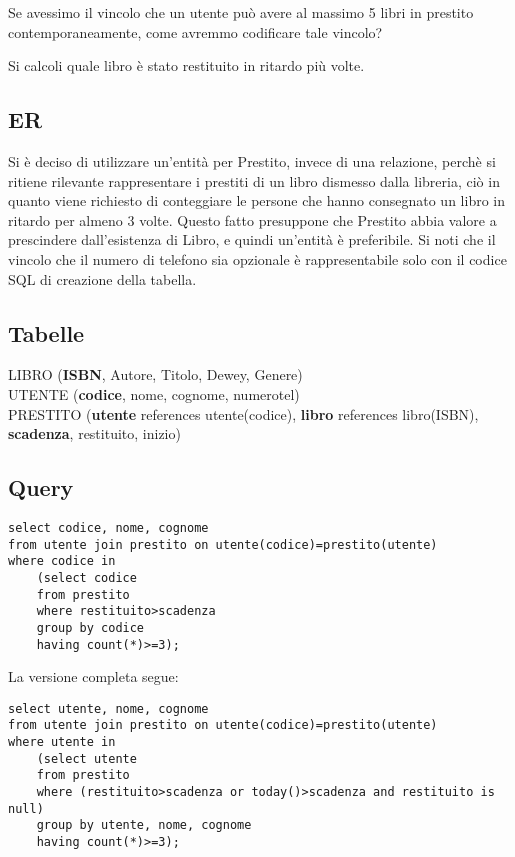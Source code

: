 \documentclass[11pt]{article}
\begin{document}
Se avessimo il vincolo che un utente pu\`o avere al massimo 5 libri in
prestito contemporaneamente, come avremmo codificare tale vincolo?

Si calcoli quale libro \`e stato restituito in ritardo pi\`u volte.

\subsection{ER}
\begin{center}
\end{center}

Si \`e deciso di utilizzare un'entit\`a per Prestito, invece di una relazione, perch\`e si
ritiene rilevante rappresentare i prestiti di un libro dismesso dalla libreria, ci\`o in
quanto viene richiesto di conteggiare le persone che hanno consegnato un libro in ritardo
per almeno 3 volte. Questo fatto presuppone che Prestito abbia valore a prescindere
dall'esistenza di Libro, e quindi un'entit\`a \`e preferibile. Si noti che il
vincolo che il numero di telefono sia opzionale \`e rappresentabile solo con il
codice SQL di creazione della tabella.

\subsection{Tabelle}

\noindent
LIBRO (\textbf{ISBN}, Autore, Titolo, Dewey, Genere)\\
UTENTE (\textbf{codice}, nome, cognome, numerotel)\\
PRESTITO (\textbf{utente} references utente(codice), \textbf{libro} references libro(ISBN),
\textbf{scadenza}, restituito, inizio)

\subsection{Query}

\begin{verbatim}
select codice, nome, cognome
from utente join prestito on utente(codice)=prestito(utente)
where codice in
    (select codice
    from prestito
    where restituito>scadenza
    group by codice
    having count(*)>=3);
\end{verbatim}

\noindent
La versione completa segue:

\begin{verbatim}
select utente, nome, cognome
from utente join prestito on utente(codice)=prestito(utente)
where utente in
    (select utente
    from prestito
    where (restituito>scadenza or today()>scadenza and restituito is null)
    group by utente, nome, cognome
    having count(*)>=3);
\end{verbatim}
\end{document}
